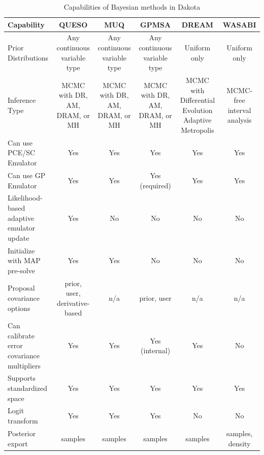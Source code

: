 \begin{table}
\centering
\caption{Capabilities of Bayesian methods in Dakota}
\label{tab:bayes_comparison}
\begin{tabulary}{\textwidth}{|L|C|C|C|C|C|}
\hline
Capability           &  QUESO  & MUQ  & GPMSA & DREAM & WASABI \\
\hline
Prior Distributions  &  Any continuous variable type
                     &  Any continuous variable type
                     &  Any continuous variable type
                     & Uniform only & Uniform only \\
\hline
Inference Type       & MCMC with DR, AM, DRAM, or MH
                     & MCMC with DR, AM, DRAM, or MH
                     & MCMC with DR, AM, DRAM, or MH
                     & MCMC with Differential Evolution Adaptive Metropolis & MCMC-free interval analysis \\
\hline
Can use PCE/SC Emulator        &  Yes            & Yes              & Yes                    & Yes  & Yes \\
\hline
Can use GP Emulator            &  Yes            &  Yes            & Yes (required)  & Yes                    & Yes \\
\hline
Likelihood-based adaptive emulator update  &  Yes            &  No             &  No             & No                     & No \\     
\hline
Initialize with MAP pre-solve  &  Yes            &  Yes            &  No             & No                     & No \\
\hline
Proposal covariance options    &  prior, user, derivative-based    & n/a                    &  prior, user  & n/a                    & n/a \\            
\hline
Can calibrate error covariance multipliers &  Yes            &  Yes            &  Yes (internal) & Yes                    & No          \\                
\hline
Supports standardized space    &  Yes            &  Yes            & Yes             & Yes                    & Yes           \\             
\hline
Logit transform                &  Yes            &  Yes            & Yes             &  No                    & No            \\             
\hline
Posterior export               &  samples        &  samples        & samples         &  samples               & samples, density \\             
\hline
\end{tabulary}
\end{table}


